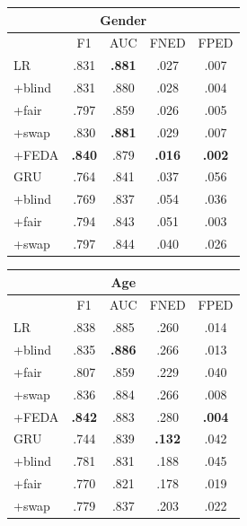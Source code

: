 \begin{table}[t!]
\centering
\begin{tabular}{l||cc|cc}
\multicolumn{5}{c}{\bf Gender} \\\hline
&F1&AUC&FNED&FPED\\\hline\hline
LR& .831 & \bf .881 & .027 & .007 \\
+blind& .831 & .880 & .028 & .004\\
+fair& .797 & .859 & .026 & .005 \\
+swap& .830 & \bf .881 & .029 & .007 \\
+FEDA& \bf .840 & .879 & \bf .016 & \bf .002\\
\hline
GRU& .764 & .841 & .037 & .056 \\
+blind& .769 & .837 & .054 & .036\\
+fair& .794 & .843 & .051 & .003\\
+swap& .797 & .844 & .040 & .026\\\hline
\end{tabular}
\quad
\begin{tabular}{l||cc|cc}
\multicolumn{5}{c}{\bf Age} \\\hline
&F1&AUC&FNED&FPED\\\hline\hline
LR& .838 & .885 & .260 & .014\\
+blind& .835 & \bf .886 & .266 & .013 \\
+fair& .807 & .859 & .229 & .040\\
+swap& .836 & .884 & .266 & .008\\
+FEDA& \bf .842 & .883 & .280 & \bf .004\\
\hline
GRU& .744 & .839 & \bf .132 & .042\\
+blind& .781 & .831 & .188 & .045 \\
+fair& .770 & .821 & .178 & .019 \\
+swap& .779 & .837 & .203 & .022 \\\hline
\end{tabular}


\end{table}
